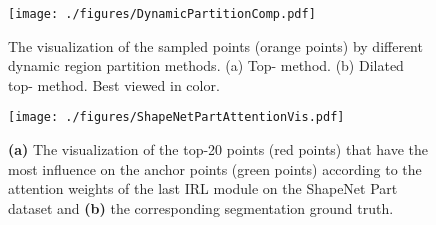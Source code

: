 \documentclass[journal]{IEEEtran}
\begin{document}
\begin{comment}
\begin{figure*}[t]
\begin{center}
  \texttt{[image: ./figures/S3DIS\_vis.pdf]}
\end{center}
\caption{The qualitative results on the S3DIS dataset.} \label{Fig.S3DIS_vis}
\end{figure*}
\end{comment}




\begin{figure}[t]
\begin{center}
    \texttt{[image: ./figures/DynamicPartitionComp.pdf]}
\end{center}
\caption{The visualization of the sampled points (orange points) by different dynamic region partition methods. (a) Top- method. (b) Dilated top- method. Best viewed in color.}
\label{Fig.DynamicRegionPartitionComp}
\end{figure}




\begin{figure*}[t]
\begin{center}
    \texttt{[image: ./figures/ShapeNetPartAttentionVis.pdf]}
\end{center}
\caption{\textbf{(a)} The visualization of the top-20 points (red points) that have the most influence on the anchor points (green points) according to the attention weights of the last IRL module on the ShapeNet Part dataset and \textbf{(b)} the corresponding segmentation ground truth.}
\label{Fig.ShapeNetPart Attention Visualization}
\end{figure*}
\end{document}
